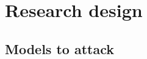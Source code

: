 \section{Research design}\label{sec:research-design}

\subsection{Models to attack}\label{subsec:models-to-attack}


